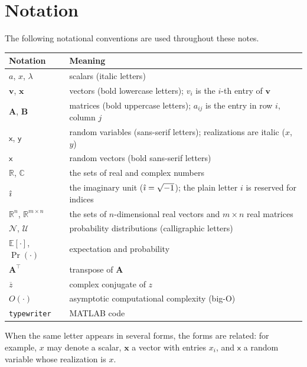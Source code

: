 \chapter*{Notation}

The following notational conventions are used throughout these notes.

\begin{center}
\begin{tabular}{ll}
    \textbf{Notation} & \textbf{Meaning} \\
    \hline
    $a$, $x$, $\lambda$ & scalars (italic letters) \\
    $\mathbf{v}$, $\mathbf{x}$ & vectors (bold lowercase letters); $v_i$ is the $i$-th entry of $\mathbf{v}$ \\
    $\mathbf{A}$, $\mathbf{B}$ & matrices (bold uppercase letters); $a_{ij}$ is the entry in row $i$, column $j$ \\
    $\mathsf{x}$, $\mathsf{y}$ & random variables (sans-serif letters); realizations are italic ($x$, $y$) \\
    $\boldsymbol{\mathsf{x}}$ & random vectors (bold sans-serif letters) \\
    $\mathbb{R}$, $\mathbb{C}$ & the sets of real and complex numbers \\
    $\hat{\imath}$ & the imaginary unit ($\hat{\imath} = \sqrt{-1}$); the plain letter $i$ is reserved for indices \\
    $\mathbb{R}^n$, $\mathbb{R}^{m \times n}$ & the sets of $n$-dimensional real vectors and $m \times n$ real matrices \\
    $\mathcal{N}$, $\mathcal{U}$ & probability distributions (calligraphic letters) \\
    $\mathbb{E}[\cdot]$, $\Pr(\cdot)$ & expectation and probability \\
    $\mathbf{A}^\top$ & transpose of $\mathbf{A}$ \\
    $\overline{z}$ & complex conjugate of $z$ \\
    $O(\cdot)$ & asymptotic computational complexity (big-O) \\
    \texttt{typewriter} & MATLAB code \\
\end{tabular}
\end{center}

When the same letter appears in several forms, the forms are related: for example, $x$ may denote a scalar, $\mathbf{x}$ a vector with entries $x_i$, and $\mathsf{x}$ a random variable whose realization is $x$.
